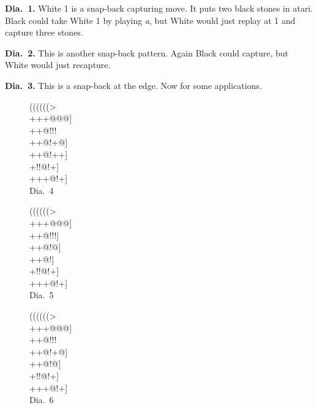 \documentclass[mcrownvopaper,10pt,twopage,onecolumn,final]{memoir}
\begin{document}
\noindent
\textbf{Dia.\ 1.} White 1 is a snap-back capturing move. It puts two black stones
in atari. Black could take White 1 by playing \textit{a}, but White would just
replay at 1 and capture three stones.

\noindent
\textbf{Dia.\ 2.} This is another snap-back pattern. Again Black could capture,
but White would just recapture.

\noindent
\textbf{Dia.\ 3.} This is a snap-back at the edge.
Now for some applications.

\begin{figure}[ht]
    \begin{minipage}[c]{0.33\linewidth}
        \centering    
        {\gnos%
        ((((((>\\
        +++@@@]\\
        ++@!!!\\
        ++@!+@]\\
        ++@!++]\\
        +!!@!+]\\
        +++@!+]\\
        }
        Dia.\ 4
    \end{minipage}%
    \begin{minipage}[c]{0.33\linewidth}
        \centering    
        {\gnos%
        ((((((>\\
        +++@@@]\\
        ++@!!!]\\
        ++@!@]\\
        ++@!{\gnosb{}}{\gnosw{}}]\\
        +!!@!+]\\
        +++@!+]\\
        }
        Dia.\ 5
    \end{minipage}%
    \begin{minipage}[c]{0.33\linewidth}
        \centering    
        {\gnos%
        ((((((>\\
        +++@@@]\\
        ++@!!!{\gnosb{}}\\
        ++@!+@]\\
        ++@!@{\gnosw{}}]\\
        +!!@!+]\\
        +++@!+]\\
        }
        Dia.\ 6
    \end{minipage}
\end{figure}
\end{document}
